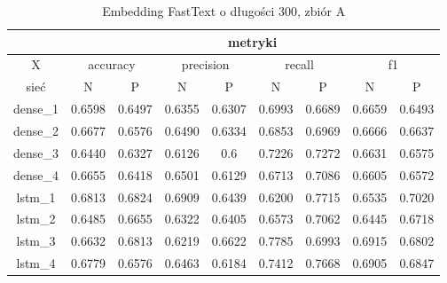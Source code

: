 \begin{table}[p] \centering
    \caption{Embedding FastText o długości 300, zbiór A}
    \label{tab:wyniki_fasttext_A}
    \begin{tabular}{|c|c|c|c|c|c|c|c|c|}    \hline

                 & \multicolumn{8}{c|}{metryki}                                                                                                                               \\ \hline
        X        & \multicolumn{2}{c|}{accuracy} & \multicolumn{2}{c|}{precision} & \multicolumn{2}{c|}{recall} & \multicolumn{2}{c|}{f1}                                     \\ \hline
        sieć     & N                             & P                              & N                           & P                       & N      & P      & N      & P      \\ \hline
        dense\_1 & 0.6598                        & 0.6497                         & 0.6355                      & 0.6307                  & 0.6993 & 0.6689 & 0.6659 & 0.6493 \\ \hline
        dense\_2 & 0.6677                        & 0.6576                         & 0.6490                      & 0.6334                  & 0.6853 & 0.6969 & 0.6666 & 0.6637 \\ \hline
        dense\_3 & 0.6440                        & 0.6327                         & 0.6126                      & 0.6                     & 0.7226 & 0.7272 & 0.6631 & 0.6575 \\ \hline
        dense\_4 & 0.6655                        & 0.6418                         & 0.6501                      & 0.6129                  & 0.6713 & 0.7086 & 0.6605 & 0.6572 \\ \hline
        lstm\_1  & 0.6813                        & 0.6824                         & 0.6909                      & 0.6439                  & 0.6200 & 0.7715 & 0.6535 & 0.7020 \\ \hline
        lstm\_2  & 0.6485                        & 0.6655                         & 0.6322                      & 0.6405                  & 0.6573 & 0.7062 & 0.6445 & 0.6718 \\ \hline
        lstm\_3  & 0.6632                        & 0.6813                         & 0.6219                      & 0.6622                  & 0.7785 & 0.6993 & 0.6915 & 0.6802 \\ \hline
        lstm\_4  & 0.6779                        & 0.6576                         & 0.6463                      & 0.6184                  & 0.7412 & 0.7668 & 0.6905 & 0.6847 \\ \hline

\end{tabular}
\end{table}
